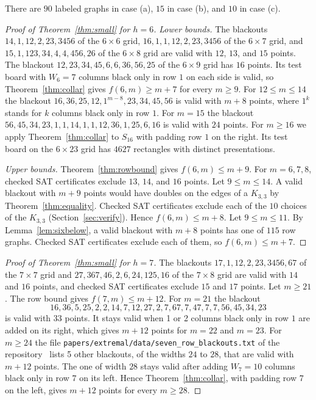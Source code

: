 There are $90$ labeled graphs in case (a), $15$ in case (b), and $10$ in case (c).

\begin{proof}[Proof of Theorem~\ref{thm:small} for $h=6$]
\emph{Lower bounds.} The blackouts $14,1,12,2,23,3456$ of the $6\times6$ grid,
$16,1,1,12,2,23,3456$ of the $6\times7$ grid, and $15,1,123,34,4,4,456,26$ of the
$6\times8$ grid are valid with $12$, $13$, and $15$ points. The blackout
$12,23,34,45,6,6,36,56,25$ of the $6\times9$ grid has $16$ points. Its test board with
$W_6=7$ columns black only in row $1$ on each side is valid, so
Theorem~\ref{thm:collar} gives $f(6,m)\ge m+7$ for every $m\ge9$. For $12\le m\le14$ the
blackout $16,36,25,12,1^{m-8},23,34,45,56$ is valid with $m+8$ points, where $1^k$ stands
for $k$ columns black only in row $1$. For $m=15$ the blackout
$56,45,34,23,1,1,14,1,1,12,36,1,25,6,16$ is valid with $24$ points. For $m\ge16$ we apply
Theorem~\ref{thm:collar} to $S_{16}$ with padding row $1$ on the right. Its test board on
the $6\times23$ grid has $4627$ rectangles with distinct presentations.

\emph{Upper bounds.} Theorem~\ref{thm:rowbound} gives $f(6,m)\le m+9$. For $m=6,7,8$,
checked SAT certificates exclude $13$, $14$, and $16$ points. Let $9\le m\le14$. A valid
blackout with $m+9$ points would have doubles on the edges of a $K_{3,3}$ by
Theorem~\ref{thm:equality}. Checked SAT certificates exclude each of the $10$ choices of
the $K_{3,3}$ (Section~\ref{sec:verify}). Hence $f(6,m)\le m+8$. Let $9\le m\le11$. By
Lemma~\ref{lem:sixbelow}, a valid blackout with $m+8$ points has one of $115$ row graphs.
Checked SAT certificates exclude each of them, so $f(6,m)\le m+7$.
\end{proof}

\begin{proof}[Proof of Theorem~\ref{thm:small} for $h=7$]
The blackouts $17,1,12,2,23,3456,67$ of the $7\times7$ grid and
$27,367,46,2,6,24,125,16$ of the $7\times8$ grid are valid with $14$ and $16$ points, and
checked SAT certificates exclude $15$ and $17$ points. Let $m\ge21$. The row bound gives
$f(7,m)\le m+12$. For $m=21$ the blackout
\[
16,36,5,25,2,2,14,7,12,27,2,7,67,7,47,7,7,56,45,34,23
\]
is valid with $33$ points. It stays valid when 1 or 2 columns black only in row $1$ are
added on its right, which gives $m+12$ points for $m=22$ and $m=23$. For $m\ge24$ the file \nolinkurl{papers/extremal/data/seven_row_blackouts.txt} of the
repository~\cite{repo} lists 5 other blackouts, of the widths $24$ to $28$, that are valid with
$m+12$ points. The one of width $28$ stays valid after adding $W_7=10$ columns black only
in row $7$ on its left. Hence Theorem~\ref{thm:collar}, with padding row $7$ on the left,
gives $m+12$ points for every $m\ge28$.
\end{proof}

